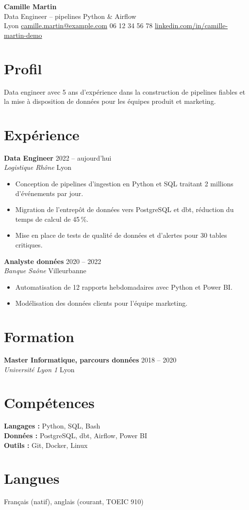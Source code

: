 \documentclass[10pt,a4paper]{article}
\newcommand{\entry}[4]{\textbf{#1} \hfill #2\\ \textit{#3} \hfill #4\\[-2pt]}
\begin{document}
\begin{center}
  {\Huge\bfseries Camille Martin}\\[4pt]
  {\large Data Engineer -- pipelines Python \& Airflow}\\[4pt]
  Lyon \textbullet{} \href{mailto:camille.martin@example.com}{camille.martin@example.com} \textbullet{} 06 12 34 56 78 \textbullet{} \href{https://www.linkedin.com/in/camille-martin-demo}{linkedin.com/in/camille-martin-demo}
\end{center}

\section{Profil}
Data engineer avec 5 ans d'expérience dans la construction de pipelines fiables et la mise à disposition de données pour les équipes produit et marketing.

\section{Expérience}
\entry{Data Engineer}{2022 -- aujourd'hui}{Logistique Rhône}{Lyon}
\begin{itemize}
  \item Conception de pipelines d'ingestion en Python et SQL traitant 2 millions d'événements par jour.
  \item Migration de l'entrepôt de données vers PostgreSQL et dbt, réduction du temps de calcul de 45\,\%.
  \item Mise en place de tests de qualité de données et d'alertes pour 30 tables critiques.
\end{itemize}

\entry{Analyste données}{2020 -- 2022}{Banque Saône}{Villeurbanne}
\begin{itemize}
  \item Automatisation de 12 rapports hebdomadaires avec Python et Power BI.
  \item Modélisation des données clients pour l'équipe marketing.
\end{itemize}

\section{Formation}
\entry{Master Informatique, parcours données}{2018 -- 2020}{Université Lyon 1}{Lyon}

\section{Compétences}
\textbf{Langages :} Python, SQL, Bash\\
\textbf{Données :} PostgreSQL, dbt, Airflow, Power BI\\
\textbf{Outils :} Git, Docker, Linux

\section{Langues}
Français (natif), anglais (courant, TOEIC 910)
\end{document}
